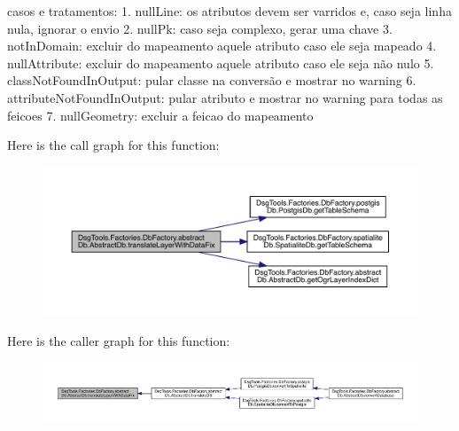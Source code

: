 \begin{DoxyVerb}casos e tratamentos:
1. nullLine: os atributos devem ser varridos e, caso seja linha nula, ignorar o envio
2. nullPk: caso seja complexo, gerar uma chave
3. notInDomain: excluir do mapeamento aquele atributo caso ele seja mapeado
4. nullAttribute: excluir do mapeamento aquele atributo caso ele seja não nulo
5. classNotFoundInOutput: pular classe na conversão e mostrar no warning
6. attributeNotFoundInOutput: pular atributo e mostrar no warning para todas as feicoes
7. nullGeometry: excluir a feicao do mapeamento
\end{DoxyVerb}
 Here is the call graph for this function\+:
\nopagebreak
\begin{figure}[H]
\begin{center}
\leavevmode
\includegraphics[width=350pt]{class_dsg_tools_1_1_factories_1_1_db_factory_1_1abstract_db_1_1_abstract_db_a170002788b3252443f4458e055207825_cgraph}
\end{center}
\end{figure}
Here is the caller graph for this function\+:
\nopagebreak
\begin{figure}[H]
\begin{center}
\leavevmode
\includegraphics[width=350pt]{class_dsg_tools_1_1_factories_1_1_db_factory_1_1abstract_db_1_1_abstract_db_a170002788b3252443f4458e055207825_icgraph}
\end{center}
\end{figure}
\mbox{\label{class_dsg_tools_1_1_factories_1_1_db_factory_1_1abstract_db_1_1_abstract_db_ab88ed94d88287d77c62271610d411494}} 
